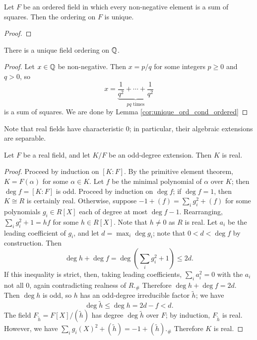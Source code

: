 \begin{corollary}
  \label{cor:unique_ord_cond_ordered}
  \leanok
  Let $F$ be an ordered field in which every non-negative element is a sum of squares. Then the ordering on $F$ is unique.
\end{corollary}
\begin{proof}
  \leanok
\end{proof}

\begin{corollary}
  \label{cor:unique_ord_Q}
  \leanok
  There is a unique field ordering on $\mathbb{Q}$.
\end{corollary}
\begin{proof}
  \leanok
  Let $x\in\mathbb{Q}$ be non-negative. Then $x=p/q$ for some integers $p\geq0$ and $q>0$, so 
  \[x=\underbrace{\frac{1}{q^2}+\cdots+\frac{1}{q^2}}_{pq\text{ times}}\]
  is a sum of squares. We are done by Lemma \ref{cor:unique_ord_cond_ordered}
\end{proof}

Note that real fields have characteristic 0; in particular, their algebraic extensions are separable.

\begin{lemma}
  \label{lem:odd_deg_real}
  Let $F$ be a real field, and let $K/F$ be an odd-degree extension. Then $K$ is real.
\end{lemma}
\begin{proof}
  Proceed by induction on $[K:F]$. By the primitive element theorem, $K=F(\alpha)$ for some $\alpha\in K$. Let $f$ be the minimal polynomial of $\alpha$ over $K$; then $\deg f=[K:F]$ is odd. Proceed by induction on $\deg f$; if $\deg f=1$, then $K\cong R$ is certainly real. Otherwise, suppose $-1+(f)=\sum_ig_i^2+(f)$ for some polynomials $g_i\in R[X]$ each of degree at most $\deg f-1$. Rearranging, $\sum_ig_i^2+1=hf$ for some $h\in R[X]$. Note that $h\neq0$ as $R$ is real. Let $a_i$ be the leading coefficient of $g_i$, and let $d=\max_i\deg g_i$; note that $0<d<\deg f$ by construction. Then
  \[\deg h+\deg f=\deg(\sum_i g_i^2+1)\leq 2d.\]
  If this inequality is strict, then, taking leading coefficients, $\sum_i a_i^2=0$ with the $a_i$ not all 0, again contradicting realness of $R$.$_\#$ Therefore $\deg h+\deg f=2d$. Then $\deg h$ is odd, so $h$ has an odd-degree irreducible factor $\tilde h$; we have
  \[\deg\tilde h\leq\deg h=2d-f<d.\]
  The field $F_{\tilde h}=F[X]/(\tilde h)$ has degree $\deg\tilde h$ over $F$; by induction, $F_{\tilde h}$ is real. However, we have $\sum_i g_i(X)^2+(\tilde h)=-1+(\tilde h)$.$_\#$ Therefore $K$ is real.
\end{proof}

